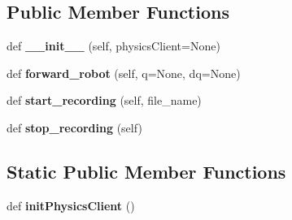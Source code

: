 \subsection*{Public Member Functions}
\begin{DoxyCompactItemize}
\item 
\mbox{\label{classrobot__properties__solo_1_1quadruped12wrapper_1_1Quadruped12Robot_a8171c7cf1414ee71560a0060d755ac3f}} 
def {\bfseries \+\_\+\+\_\+init\+\_\+\+\_\+} (self, physics\+Client=None)
\item 
\mbox{\label{classrobot__properties__solo_1_1quadruped12wrapper_1_1Quadruped12Robot_a9a8b5e460e54ec59a00b4341c52fee2f}} 
def {\bfseries forward\+\_\+robot} (self, q=None, dq=None)
\item 
\mbox{\label{classrobot__properties__solo_1_1quadruped12wrapper_1_1Quadruped12Robot_ab601f30d87aa9b711c3d7d7def0312db}} 
def {\bfseries start\+\_\+recording} (self, file\+\_\+name)
\item 
\mbox{\label{classrobot__properties__solo_1_1quadruped12wrapper_1_1Quadruped12Robot_a1bb2fd5cc2c45c2812dc9874449274d1}} 
def {\bfseries stop\+\_\+recording} (self)
\end{DoxyCompactItemize}
\subsection*{Static Public Member Functions}
\begin{DoxyCompactItemize}
\item 
\mbox{\label{classrobot__properties__solo_1_1quadruped12wrapper_1_1Quadruped12Robot_a02e6228a8e81b0359a02f481ea4bd4a6}} 
def {\bfseries init\+Physics\+Client} ()
\end{DoxyCompactItemize}
